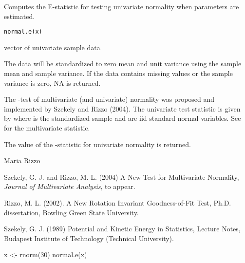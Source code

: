 \documentclass{article}
\begin{document}
\begin{Description}\relax
Computes the E-statistic for testing univariate normality 
when parameters are estimated.
\end{Description}
\begin{Usage}
\begin{verbatim}
normal.e(x)
\end{verbatim}
\end{Usage}
\begin{Arguments}
\begin{ldescription}
\item[\code{x}] vector of univariate sample data
\end{ldescription}
\end{Arguments}
\begin{Details}\relax
The
data will be standardized to zero mean and unit variance
using the sample mean and sample variance. If the data contains
missing values or the sample variance is zero, NA is
returned.

The 
-test of multivariate (and univariate)
normality was proposed and implemented by Szekely and Rizzo 
(2004). The univariate test statistic
is given by
where  is the standardized sample and
 are iid standard normal variables. See 
 for the multivariate statistic.\end{Details}
\begin{Value}
The value of the -statistic for univariate
normality is returned.\end{Value}
\begin{Author}\relax
Maria Rizzo 
\end{Author}
\begin{References}\relax
Szekely, G. J. and Rizzo, M. L. (2004) A New Test for 
Multivariate Normality, \emph{Journal of Multivariate Analysis},
to appear.

Rizzo, M. L. (2002). A New Rotation Invariant Goodness-of-Fit Test,
Ph.D. dissertation, Bowling Green State University.

Szekely, G. J. (1989) Potential and Kinetic Energy in Statistics, 
Lecture Notes, Budapest Institute of Technology (Technical University).\end{References}
\begin{SeeAlso}\relax
{}
\end{SeeAlso}
\begin{Examples}
\begin{ExampleCode}
 x <- rnorm(30)
 normal.e(x)
\end{ExampleCode}
\end{Examples}
\end{document}
